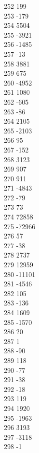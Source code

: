 { 252	199 \\
 253	-179 \\
 254	5504 \\
 255	-3921 \\
 256	-1485 \\
 257	-13 \\
 258	3881 \\
 259	675 \\
 260	-4952 \\
 261	1080 \\
 262	-605 \\
 263	-86 \\
 264	2105 \\
 265	-2103 \\
 266	95 \\
 267	-152 \\
 268	3123 \\
 269	907 \\
 270	911 \\
 271	-4843 \\
 272	-79 \\
 273	73 \\
 274	72858 \\
 275	-72966 \\
 276	57 \\
 277	-38 \\
 278	2737 \\
 279	12959 \\
 280	-11101 \\
 281	-4546 \\
 282	105 \\
 283	-136 \\
 284	1609 \\
 285	-1570 \\
 286	20 \\
 287	1 \\
 288	-90 \\
 289	118 \\
 290	-77 \\
 291	-38 \\
 292	-18 \\
 293	119 \\
 294	1920 \\
 295	-1963 \\
 296	3193 \\
 297	-3118 \\
 298	-1 \\
}
